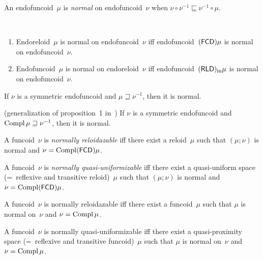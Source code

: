 \begin{defn}
An endofuncoid~$\mu$ is \emph{normal} on endofuncoid~$\nu$ when $\nu \circ \nu^{-1} \sqsubseteq \nu^{-1} \circ \mu$.
\end{defn}

\begin{obvious}\label{norm-fcd-rld}
~
\begin{enumerate}
\item Endoreloid~$\mu$ is normal on endofuncoid~$\nu$ iff endofuncoid~$(\mathsf{FCD})\mu$ is normal on endofuncoid~$\nu$.
\item Endofuncoid~$\mu$ is normal on endoreloid~$\nu$ iff endofuncoid~$(\mathsf{RLD})_{\mathrm{in}}\mu$ is normal on endofuncoid~$\nu$.
\end{enumerate}
\end{obvious}

\begin{cor}
If $\nu$ is a symmetric endofuncoid and $\mu\sqsupseteq \nu^{-1}$, then it is normal.
\end{cor}

\begin{cor} (generalization of proposition~1 in~\cite{2014arXiv1410.1504B})
If $\nu$ is a symmetric endofuncoid and $\operatorname{Compl}\mu\sqsupseteq \nu^{-1}$, then it is normal.
\end{cor}

\begin{defn}
A funcoid~$\nu$ is \emph{normally reloidazable} iff there exist a reloid~$\mu$ such that
$(\mu;\nu)$ is normal and $\nu=\operatorname{Compl}(\mathsf{FCD})\mu$.
\end{defn}

\begin{defn}
A funcoid~$\nu$ is \emph{normally quasi-uniformizable} iff there exist a quasi-uniform space (=~reflexive and transitive reloid)~$\mu$ such that
$(\mu;\nu)$ is normal and $\nu=\operatorname{Compl}(\mathsf{FCD})\mu$.
\end{defn}

\begin{prop}
A funcoid~$\nu$ is normally reloidazable iff there exist a funcoid~$\mu$ such that
$\mu$ is normal on~$\nu$ and $\nu=\operatorname{Compl}\mu$.
\end{prop}

\begin{prop}
A funcoid~$\nu$ is normally quasi-uniformizable iff there exist a quasi-proximity space (=~reflexive and transitive funcoid)~$\mu$ such that
$\mu$ is normal on~$\nu$ and $\nu=\operatorname{Compl}\mu$.
\end{prop}

